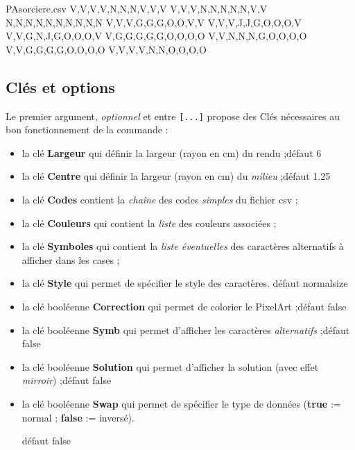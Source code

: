 \documentclass{article}
\newcommand\Cle[1]{{\bfseries\sffamily\textlangle #1\textrangle}}
\begin{document}
\begin{PresentationCode}{}
\begin{filecontents*}{PAsorciere.csv}
V,V,V,V,N,N,N,V,V,V
V,V,V,N,N,N,N,N,V,V
N,N,N,N,N,N,N,N,N,N
V,V,V,G,G,G,O,O,V,V
V,V,V,J,J,G,O,O,O,V
V,V,G,N,J,G,O,O,O,V
V,G,G,G,G,G,O,O,O,O
V,V,N,N,N,G,O,O,O,O
V,V,G,G,G,G,O,O,O,O
V,V,V,V,N,N,O,O,O,O
\end{filecontents*}

\end{PresentationCode}

\subsection{Clés et options}

Le premier argument, \textit{optionnel} et entre \texttt{[...]} propose des \textsf{Clés} nécessaires au bon fonctionnement de la commande :

\begin{itemize}
	\item la clé \Cle{Largeur} qui définir la largeur (rayon en cm) du rendu ;\hfill{}défaut \textsf{6}
	\item la clé \Cle{Centre} qui définir la largeur (rayon en cm) du \textit{milieu} ;\hfill{}défaut \textsf{1.25}
	\item la clé \Cle{Codes} contient la \textit{chaîne} des codes \textit{simples} du  fichier \textsf{csv} ;
	\item la clé \Cle{Couleurs} qui contient la \textit{liste} des couleurs associées ;
	\item la clé \Cle{Symboles} qui contient la \textit{liste éventuelles} des caractères alternatifs à afficher dans les cases ;
	\item la clé \Cle{Style} qui permet de spécifier le style des caractères. \hfill{}défaut \textsf{normalsize}
	\item la clé booléenne \Cle{Correction} qui permet de colorier le PixelArt ;\hfill{}défaut \textsf{false}
	\item la clé booléenne \Cle{Symb} qui permet d'afficher les caractères \textit{alternatifs} ;\hfill{}défaut \textsf{false}
	\item la clé booléenne \Cle{Solution} qui permet d'afficher la solution (avec effet \textit{mirroir}) ;\hfill{}défaut \textsf{false}
	\item la clé booléenne \Cle{Swap} qui permet de spécifier le type de données (\Cle{true} := normal ; \Cle{false} := inversé).
	
	\hfill{}défaut \textsf{false}
\end{itemize}
\end{document}
